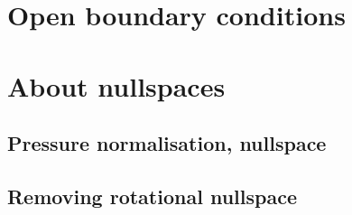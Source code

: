 \newpage %
\section{Open boundary conditions}\label{ss:openbc} %

\newpage %
\section{About nullspaces} 
\subsection{Pressure normalisation, nullspace\label{ss_pnorm}}  %
\subsection{Removing rotational nullspace\label{ss_nullspace}}  %

